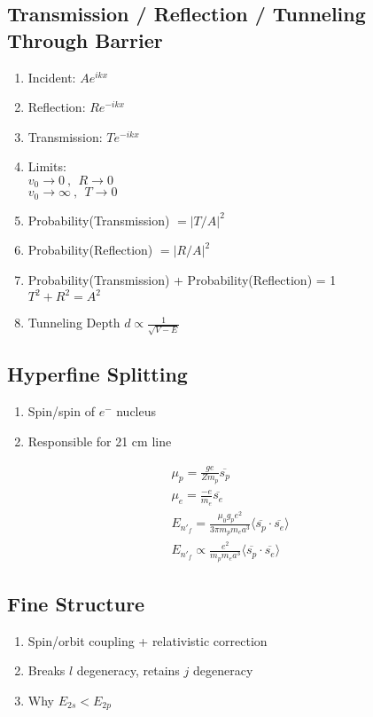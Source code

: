 \documentclass[10pt,a4paper]{article}
\begin{document}
\subsection{Transmission / Reflection / Tunneling Through Barrier}

\begin{enumerate}
    \item Incident: $Ae^{ikx}$
    \item Reflection: $Re^{-ikx}$ 
    \item Transmission: $Te^{-ikx}$
    \item Limits: \\
    $v_0 \rightarrow 0~,~~ R \rightarrow 0$\\
    $v_0 \rightarrow \infty ~,~~ T \rightarrow 0$
    \item Probability(Transmission) $=|T/A|^2$ 
    \item Probability(Reflection) $=|R/A|^2$
    \item Probability(Transmission) + Probability(Reflection) = 1\\
    $T^2 + R^2 = A^2$
    \item Tunneling Depth $d \propto \frac{1}{\sqrt{V-E}} $
\end{enumerate}

\subsection{Hyperfine Splitting}
\begin{enumerate}
    \item Spin/spin of $e^-$ nucleus
    \item Responsible for 21 cm line 
\end{enumerate}

\begin{align}
 \mu_p = \frac{ge}{Zm_p}\overline{s_p}\\
 \mu_e = \frac{-e}{m_e}\overline{s_e}\\
 E_{n'_f} = \frac{\mu_0 g_p e^2}{3 \pi m_p m_e a^3} \langle \overline{s_p} \cdot \overline{s_e} \rangle\\
 E_{n'_f} \propto \frac{e^2}{m_pm_ea^3} \langle \overline{s_p} \cdot \overline{s_e} \rangle
\end{align}

\subsection{Fine Structure}
\begin{enumerate}
    \item Spin/orbit coupling + relativistic correction
    \item Breaks $l$ degeneracy, retains $j$ degeneracy
    \item Why $E_{2s} < E_{2p}$
\end{enumerate}
\end{document}
